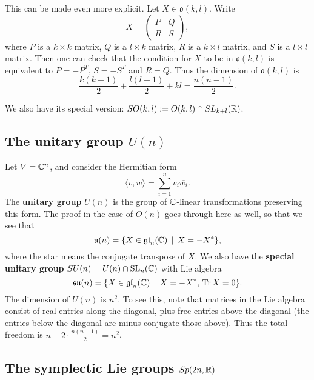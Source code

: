 \documentclass[11pt, english]{article}
\begin{document}
This can be made even more explicit. Let $X \in \mathfrak{o}(k,l)$. Write
$$
X = \begin{pmatrix}
P & Q \\
R & S
\end{pmatrix},
$$
where $P$ is a $k \times k$ matrix, $Q$ is a $l \times k$ matrix, $R$ is a $k \times l$ matrix, and $S$ is a $l \times l$ matrix. Then one can check that the condition for $X$ to be in $\mathfrak{o}(k,l)$ is equivalent to $P=-P^T$, $S=-S^T$ and $R=Q$. Thus the dimension of $\mathfrak{o}(k,l)$ is
$$
\frac{k(k-1)}{2} + \frac{l(l-1)}{2} + kl = \frac{n(n-1)}{2}.
$$

We also have its special version: $SO(k,l) := O(k,l) \cap SL_{k+l}(\mathbb{R})$. 

\subsection{The unitary group $U(n)$}

Let $V=\mathbb{C}^n$, and consider the Hermitian form
$$
\langle v, w \rangle = \sum_{i=1}^n v_i \overline{w_i}.
$$
The \textbf{unitary group} $U(n)$ is the group of $\mathbb{C}$-linear transformations preserving this form. The proof in the case of $O(n)$ goes through here as well, so that we see that
$$
\mathfrak{u}(n) = \{ X \in \mathfrak{gl}_n(\mathbb{C}) \, \mid \, X = -X^\ast \},
$$
where the star means the conjugate transpose of $X$. We also have the \textbf{special unitary group} $SU(n) = U(n) \cap \operatorname{SL}_n(\mathbb{C})$ with Lie algebra
$$
\mathfrak{su}(n) = \{ X \in \mathfrak{gl}_n(\mathbb{C}) \, \mid \, X = -X^\ast, \, \operatorname{Tr} X = 0\}.
$$
The dimension of $U(n)$ is $n^2$. To see this, note that matrices in the Lie algebra consist of real entries along the diagonal, plus free entries above the diagonal (the entries below the diagonal are minus conjugate those above). Thus the total freedom is $n+2 \cdot \frac{n(n-1)}{2} = n^2$.

\subsection{The symplectic Lie groups $Sp(2n,\mathbb{R})$}
\end{document}
